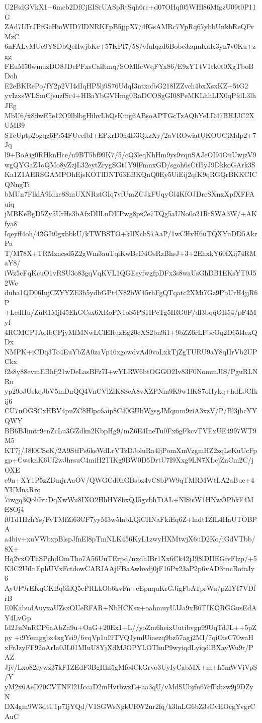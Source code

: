 U2FsdGVkX1+6mcb2DfCjEISrUASpRtSqh6rc+d07OHqf05WHl86MfgzU09t0P11G
ZAd7LTrJPfGcHioWID7IDNRKFpB5jjpX7/4fGsAMRc7YpRq67ybbUnkbReQFvMzC
6nFALvMUe9YSDbQeHwjbKc+57KPI7/58/vfuIqzd6Bobc3zqmKaK3yn7v0Ku+zgg
FEuM50wmuzDO8JDcPFxsCailtmq/SOMlfcWqFYx86/E9zYTtV1tk0t0XgTboBDoh
E2eBKRePo/fY2p2VI4dIqHP5lj9S76UdqI3ntxofbG218IZZvch4bxXsxKZ+5tG2
yvIzxsWLSmCjsuzfSc4+HBaYbGVHmg0RaDCOSgGI08PeMKLhhLIX0qPfdL3lhJEg
MbU6/x8dwE5e12O9lblbgHihvLhQsKmg6ABsoAPTGcTzAQbYeLD47BHJJC2XUMB9
STcUptp2ogqg6Pr54FUeefbI+EPxrD0n4D3QxzXy/2aVROwiatUKOUGiMdp2+7Jq
l9+BoAig0RHknHce/n9BT5bf99K7/5/cQ3leqKhHm9ys9vqnSAJeOI94OuUwjzV9
wgQYGaZJoQMo8yZzjL32eytZrygSGt1Y9lFmnxGD/sgoh6sCtl5yJ9DkkoGArk3S
Ka1Z1AERSGAMPOhEjsKOTlDNT63EBKQnQ0Ey5UiEij2qfK9qRGQrBKKCICQNngTi
bMUn7FlklA9Idke8SmUXNRztGIq7vfUmZCJkFUqyGl4KfOJDreSXnxXpfXFFAuiq
jMBKeBgD5Zy5UrHs3bAfxDIlLnDUPwg8px2e7TQg5aUNo0o21RtSWA3W/+AKfya8
Iqeyff4oh/42GIt0gxbbkU/kTWBSTO+kIlXcbS7AaP/1wCHvH6uTQXYuDD5AkrPa
T/M78X+TRMzncsd5Z2gWm3auTqiKwBeD4OsRzBhsJ+3+2EhxkY60fXij74RMaY8/
iWz5cFqKcuO1vRSU3o83gqVqKVL1QGEsyfwgfpDFx3s8waUsGhDB1EKsYT9J52Wc
duha1QD06IujCZYYZE3b5ydbGPt4N82bW45rhFgQTqatc2XMi7Gz9PbUrH4jjR6P
+LedHu/ZuR1Mjf45EhGCsx6XRoFN1oS5PS1IPcTg5IRG0F/dl3bqqOH54/pF4Myf
4RCMCPJAolbCPjyMfMNwLClERuzEg20eXS2bn9i1+9bZZ6rLPbcOq2D65l4exQDx
NMPK+iCDq3To4EuYbZA0zaVp46xgcwdvAd0voLxkTjZgTURU9aY8qIIrVb2UPCkx
f2s8y88evmEBhfj21wDeLasBFz7I+wYLRW6btOGGO2Iv83F0NommJIS/PguRLNRn
yp29oJUskqJbV5mDnQQ4VnCVlZlK8ScA8vXZPNm9K9w1lKS7oHykq+hdLJCIkij6
CU7uOGSCxHBV4puZC8Hlpc6aip8C40GUbWgsgJMqmm9ziA3xzV/P/Bl3jhcYYQWY
BB6BJimtr9cnZcLu3GZdkn2KbpHg9/mZ6E4IneTu0Fx6gFkcvTVExUE4997WT9M5
KT7j/J8l0CScK/2A9StfPs6ksWdLrVTzDJoluRa4ljPomXmVzgmHZ2zqLeKuUcFp
gp+CwsknK6Uf2wJhrsuC4miH2TIKg9BW0D5DrtU7I9Xxg9LN7XLcjZnCm2C/jOXE
e9n+XY1P5zZDmjrAaOV/QWGCd0hGBsbz4vC8bPW9qTMRMWtLA2aBuc+4YUMnaRro
7iwgq3QohIruDqXwWu8IXO2HhHY8bxQJ5gvbhTiAL+NlSisW1HNwOPbkF4ME8Oj4
f0Td1HzhYs/FvTMfZi63CF7yyM3w5lnbLQiCHNaFkiEq6Z+lndt1ZfL4HaUTOBPA
a4biv+xuVWbxpBlspJfnEl8pTmNLK456KyL1zwyHXMtwjX6uD2Ko/iGdVTbb/8X+
Hq2vxOThSPchdOmTho7A56UuTErpd/nxdhIBr1Xx6Ck42jJ98lDIIEGfvFlzp/+5
K3C2UiInEphUVxFctdowCABJAAjFBaAwbvdj0jF16Px23aP2p6vAD3tncBoiuJy6
AyUP9rEKqCKBq6filQ5cPRLkOb6kvFn+eEpnquKrGJigFbATprWu/pZIYI7VDfrB
E0KabudAuyxaUZsxOUeRFAR+NbHCKsx+oahmuyUJJa9xB6TIKQRGGusEdAY4LvGp
Id2JuNnRCP6aAbZa9u+OaG+20Ex1+L//yoZm6heixUutibvgp99UqTdJL++5pZpy
+i9Yemggbx4xgYsi9/6vqVp1uI9TVQJymlUiaezq9bz57agj2MI/7qiOisC70waH
xFrJzyFF92oArIa0JL01MIuU8YjXdMJOPYLOThuP9wyiqdLyiqdlBXayWu9r/PAZ
Jjv/Lxo82eywz37kF1ZEdF3BgHhf5gMfe4CkGrvo3UyIyCabMX+m+h5mWViVpS/Y
yM2x6AeD20CVTNFl21IccaD2mHvtbwzE+aa3qU/vMdSUbjfn67cfIkbzw9j9DZyN
DX4gm9W3dtU1p7IjYQd/V1SGWsNgkURW2ur2fq/k3lnLG6bZ3sCvHOcgYvgrCAuC
